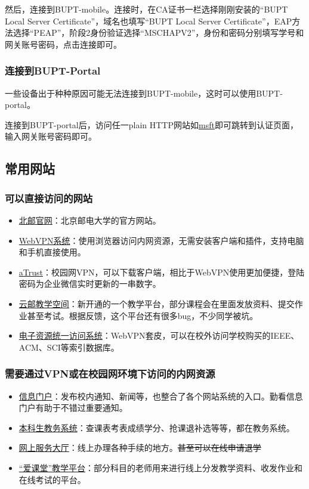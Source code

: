 然后，连接到BUPT-mobile。连接时，在CA证书一栏选择刚刚安装的“BUPT Local Server Certificate”，域名也填写“BUPT Local Server Certificate”，EAP方法选择“PEAP”，阶段2身份验证选择“MSCHAPV2”，身份和密码分别填写学号和网关账号密码，点击连接即可。

\subsubsection*{连接到BUPT-Portal}

一些设备出于种种原因可能无法连接到BUPT-mobile，这时可以使用BUPT-portal。

连接到BUPT-portal后，访问任一plain HTTP网站如\href{http://www.msftconnecttest.com/redirect}{msft}即可跳转到认证页面，输入网关账号密码即可。

\subsection{常用网站}

\subsubsection*{可以直接访问的网站}
\begin{itemize}
    \item \href{https://www.bupt.edu.cn/}{北邮官网}：北京邮电大学的官方网站。
    \item \href{https://webvpn.bupt.edu.cn/}{WebVPN系统}：使用浏览器访问内网资源，无需安装客户端和插件，支持电脑和手机直接使用。
    \item \href{https://vpn.bupt.edu.cn/}{aTrust}：校园网VPN，可以下载客户端，相比于WebVPN使用更加便捷，登陆密码为企业微信实时更新的一串数字。
    \item \href{https://ucloud.bupt.edu.cn/}{云邮教学空间}：新开通的一个教学平台，部分课程会在里面发放资料、提交作业甚至考试。根据反馈，这个平台还有很多bug，不少同学被坑。
    \item \href{https://libcon.bupt.edu.cn/}{电子资源统一访问系统}：WebVPN套皮，可以在校外访问学校购买的IEEE、ACM、SCI等索引数据库。
\end{itemize}

\subsubsection*{需要通过VPN或在校园网环境下访问的内网资源}
\begin{itemize}
    \item \href{http://my.bupt.edu.cn/}{信息门户}：发布校内通知、新闻等，也整合了各个网站系统的入口。勤看信息门户有助于不错过重要通知。
    \item \href{https://jwgl.bupt.edu.cn/}{本科生教务系统}：查课表考表成绩学分、抢课退补选等等，都在教务系统。
    \item \href{https://service.bupt.edu.cn/}{网上服务大厅}：线上办理各种手续的地方。\sout{甚至可以在线申请退学}
    \item \href{https://iclass.bupt.edu.cn/}{“爱课堂”教学平台}：部分科目的老师用来进行线上分发教学资料、收发作业和在线考试的平台。
\end{itemize}

